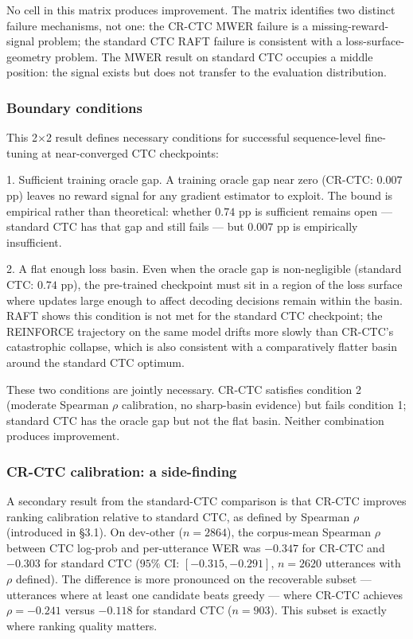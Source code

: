 No cell in this matrix produces improvement. The matrix identifies two distinct failure mechanisms, not one: the CR-CTC MWER failure is a missing-reward-signal problem; the standard CTC RAFT failure is consistent with a loss-surface-geometry problem. The MWER result on standard CTC occupies a middle position: the signal exists but does not transfer to the evaluation distribution.

\subsubsection{Boundary conditions}

This 2$\times$2 result defines necessary conditions for successful sequence-level fine-tuning at near-converged CTC checkpoints:

1. Sufficient training oracle gap. A training oracle gap near zero (CR-CTC: $0.007$ pp) leaves no reward signal for any gradient estimator to exploit. The bound is empirical rather than theoretical: whether $0.74$ pp is sufficient remains open — standard CTC has that gap and still fails — but $0.007$ pp is empirically insufficient.

2. A flat enough loss basin. Even when the oracle gap is non-negligible (standard CTC: $0.74$ pp), the pre-trained checkpoint must sit in a region of the loss surface where updates large enough to affect decoding decisions remain within the basin. RAFT shows this condition is not met for the standard CTC checkpoint; the REINFORCE trajectory on the same model drifts more slowly than CR-CTC's catastrophic collapse, which is also consistent with a comparatively flatter basin around the standard CTC optimum.

These two conditions are jointly necessary. CR-CTC satisfies condition 2 (moderate Spearman $\rho$ calibration, no sharp-basin evidence) but fails condition 1; standard CTC has the oracle gap but not the flat basin. Neither combination produces improvement.

\subsubsection{CR-CTC calibration: a side-finding}

A secondary result from the standard-CTC comparison is that CR-CTC improves ranking calibration relative to standard CTC, as defined by Spearman $\rho$ (introduced in §3.1). On dev-other ($n = 2864$), the corpus-mean Spearman $\rho$ between CTC log-prob and per-utterance WER was $-0.347$ for CR-CTC and $-0.303$ for standard CTC ($95\%$ CI: $[-0.315, -0.291]$, $n=2620$ utterances with $\rho$ defined). The difference is more pronounced on the recoverable subset — utterances where at least one candidate beats greedy — where CR-CTC achieves $\rho = -0.241$ versus $-0.118$ for standard CTC ($n = 903$). This subset is exactly where ranking quality matters.

